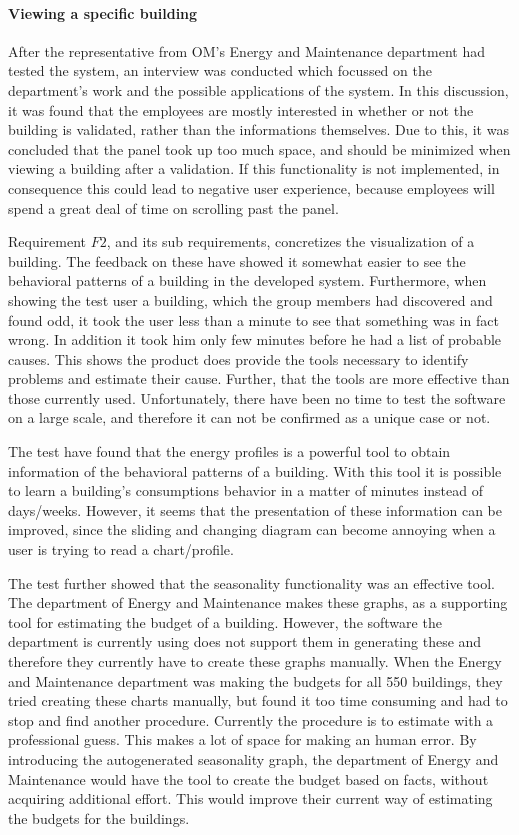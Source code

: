 \paragraph{Viewing a specific building}
After the representative from OM’s Energy and Maintenance department had tested the system, an interview was conducted which focussed on the department’s work and the possible applications of the system. In this discussion, it was found that the employees are mostly interested in whether or not the building is validated, rather than the informations themselves. Due to this, it was concluded that the panel took up too much space, and should be minimized when viewing a building after a validation. If this functionality is not implemented, in consequence this could lead to negative user experience, because employees will spend a great deal of time on scrolling past the panel.

Requirement $F2$, and its sub requirements, concretizes the visualization of a building. The feedback on these have showed it somewhat easier to see the behavioral patterns of a building in the developed system. Furthermore, when showing the test user a building, which the group members had discovered and found odd, it took the user less than a minute to see that something was in fact wrong. In addition it took him only few minutes before he had a list of probable causes. This shows the product does provide the tools necessary to identify problems and estimate their cause. Further, that the tools are more effective than those currently used. Unfortunately, there have been no time to test the software on a large scale, and therefore it can not be confirmed as a unique case or not. 

The test have found that the energy profiles is a powerful tool to obtain information of the behavioral patterns of a building. With this tool it is possible to learn a building's consumptions behavior in a matter of minutes instead of days/weeks. However, it seems that the presentation of these information can be improved, since the sliding and changing diagram can become annoying when a user is trying to read a chart/profile.

The test further showed that the seasonality functionality was an effective tool. The department of Energy and Maintenance makes these graphs, as a supporting tool for estimating the budget of a building. However, the software the department is currently using does not support them in generating these and therefore they currently have to create these graphs manually. When the Energy and Maintenance department was making the budgets for all 550 buildings, they tried creating these charts manually, but found it too time consuming and had to stop and find another procedure. Currently the procedure is to estimate with a professional guess. This makes a lot of space for making an human error. By introducing the autogenerated seasonality graph, the department of Energy and Maintenance would have the tool to create the budget based on facts, without acquiring additional effort. This would improve their current way of estimating the budgets for the buildings.

